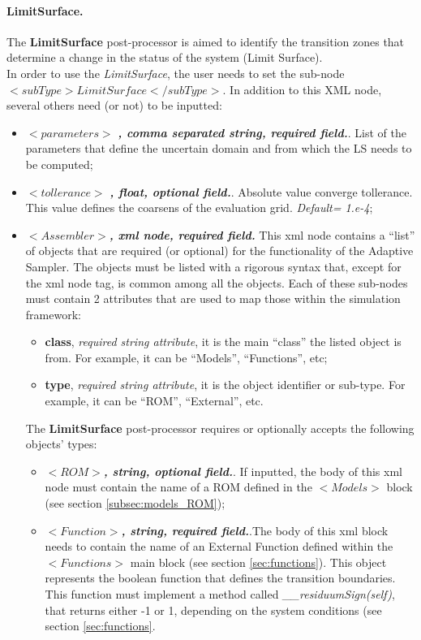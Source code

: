 \paragraph{LimitSurface.}
\label{LimitSurface}
The \textbf{LimitSurface} post-processor is aimed to identify the transition zones that determine a change in the status of the system (Limit Surface). 
\\In order to use the   \textit{LimitSurface}, the user needs to set the sub-node $<subType>LimitSurface</subType>$. In addition to this XML node, several others need (or not) to be inputted:
\begin{itemize}
\item $<parameters>$ \textbf{\textit{, comma separated string, required field.}}. List of the parameters that define the uncertain domain and from which the LS needs to be computed;
\item $<tollerance>$ \textbf{\textit{, float, optional field.}}. Absolute value converge tollerance. This value defines the coarsens  of the evaluation grid. \textit{Default= 1.e-4};
 \item $<Assembler>$\textbf{\textit{, xml node, required field.}} This xml node contains a ``list'' of objects that are required (or optional) for the functionality of the Adaptive Sampler. The objects must be listed with a rigorous syntax that, except for the xml node tag, is common among all the objects.  
Each of these sub-nodes  must contain 2 attributes that are used to map those within the simulation framework:
   \begin{itemize}
     \item \textbf{class}, \textit{required string attribute}, it is the main ``class'' the listed object is from. For example, it can be ``Models'', ``Functions'', etc;
     \item \textbf{type},  \textit{required string attribute}, it is the object identifier or sub-type. For example, it can be ``ROM'', ``External'', etc.
    \end{itemize}
   The \textbf{LimitSurface} post-processor requires or optionally accepts the following objects' types:
   \begin{itemize}
     \item $<ROM>$\textbf{\textit{, string, optional  field.}}. If inputted, the body of this xml node must contain the name of a ROM defined in the $<Models>$ block (see section \ref{subsec:models_ROM});
       \item $<Function>$\textbf{\textit{, string, required field.}}.The body of this xml block needs to contain the name of an External Function defined within the $<Functions>$ main block (see section \ref{sec:functions}). This object represents the boolean function that defines the transition boundaries. This function must implement a method called \textit{\_\_residuumSign(self)}, that returns either -1 or 1, depending on the system conditions (see section \ref{sec:functions}.
    \end{itemize}
\end{itemize}

